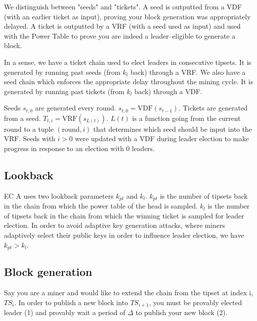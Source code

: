 \documentclass{article}
\newcommand{\ec}{EC A}
\begin{document}
We distinguish between "seeds" and "tickets".
A seed is outputted from a VDF (with an earlier ticket as input), proving your block generation was appropriately delayed. A ticket is outputted by a VRF (with a seed used as input) and used with the Power Table to prove you are indeed a leader--eligible to generate a block.

In a sense, we have a ticket chain used to elect leaders in consecutive tipsets. It is generated by running past seeds (from $k_l$ back) through a VRF.
We also have a seed chain which enforces the appropriate delay throughout the mining cycle. It is generated by running past tickets (from $k_l$ back) through a VDF.

Seeds $s_{t,0}$ are generated every round.  $s_{t,0} = \text{VDF}(s_{t-1})$.  Tickets are generated from a seed.  $T_{t,i} = \text{VRF}(s_{L(t)}) $.  $L(t) $ is a function going from the current round to a tuple $(\text{round}, i)$ that determines which seed should be input into the VRF.  Seeds with $i > 0$ were updated with a VDF during leader election to make progress in response to an election with 0 leaders.

\subsection{Lookback}
\ec{} uses two lookback parameters $k_{pt}$ and $k_{l}$.  $k_{pt}$ is the number of tipsets back in the chain from which the power table of the head is sampled.  $k_{l}$ is the number of tipsets back in the chain from which the winning ticket is sampled for leader election.  In order to avoid adaptive key generation attacks, where miners adaptively select their public keys in order to influence leader election, we have $k_{pt} > k_{l}$.  

\subsection{Block generation}
Say you are a miner and would like to extend the chain from the tipset at index i, $TS_i$. In order to publish a new block into $TS_{i+1}$, you must be provably elected leader (1) and provably wait a period of $\Delta$ to publish your new block (2).
\end{document}

